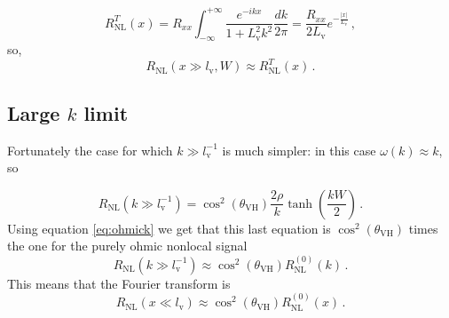 \begin{equation}
    R_{\textrm{NL}}^T(x)=
    R_{xx}\int_{-\infty}^{+\infty}
    \frac {e^{-ikx}}{1+L_\textrm{v}^2k^2}
    \frac {dk}{2\pi}=
    \frac{R_{xx}}{2L_\textrm{v}}e^{-\frac{|x|}{L_\textrm{v}}}\,,
\end{equation}
so,
\begin{equation}
    R_{\textrm{NL}}(x\gg l_\textrm{v},W)\approx R_{\textrm{NL}}^T(x)\,.
    \label{eq:rxg}
\end{equation}

\subsection{Large $k$ limit}
Fortunately the case for which $k\gg l_\textrm{v}^{-1}$ is much simpler: in this case $\omega(k) \approx k$, so

\begin{equation}
    R_{\textrm{NL}}(k\gg l_\textrm{v}^{-1})=\cos^2(\theta_{\textrm{VH}})\frac {2\rho}{k}\tanh\left(\frac{kW}2\right)\,.
\end{equation}
Using equation \ref{eq:ohmick} we get that this last equation is $\cos^2(\theta_{\textrm{VH}})$ times the one for the purely ohmic nonlocal signal
\begin{equation}
    R_{\textrm{NL}}(k\gg l_\textrm{v}^{-1})\approx
    \cos^2(\theta_{\textrm{VH}})R_{\textrm{NL}}^{(0)}(k)\,.
\end{equation}
This means that the Fourier transform is
\begin{equation}
    R_{\textrm{NL}}(x\ll l_\textrm{v})\approx\cos^2(\theta_{\textrm{VH}})R_{\textrm{NL}}^{(0)}(x)\,.
    \label{eq:rxl}
\end{equation}
